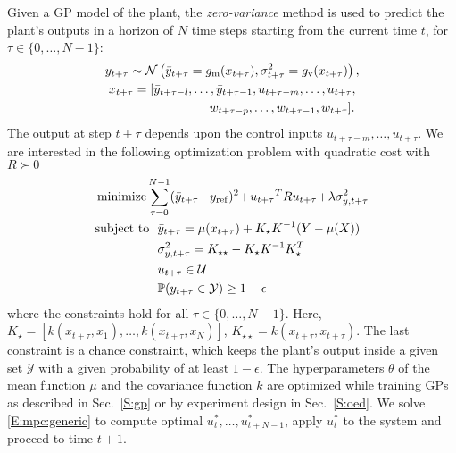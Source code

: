 Given a GP model of the plant, the \emph{zero-variance} method is used to predict the plant's outputs in a horizon of $N$ time steps starting from the current time $t$, for \(\tau \in \{0,\dots,N-1\}\):
\begin{gather}
y_{t+\tau} \sim \operatorname*{\mathcal{N}}\left(\bar{y}_{t+\tau} = g_{\mathrm m}(x_{t+\tau}), \sigma^2_{t+\tau} = g_{\mathrm v}(x_{t+\tau})\right), \\
x_{t + \tau} = [\bar y_{t+ \tau-l}, \dots, \bar y_{t+ \tau-1}, u_{t+ \tau-m}, \dots, u_{t+ \tau}, \nonumber \\
\qquad\qquad\qquad\qquad  w_{t+ \tau-p}, \dots, w_{t+ \tau-1}, w_{t+ \tau}]\text. \nonumber
\end{gather}
The output at step \(t+\tau\) depends upon %
the control inputs \(u_{t+\tau-m}, \dots, u_{t+\tau}\).
We are interested in the following optimization problem with quadratic cost with \(R \succ 0\)
\begin{align}
  &\minimize \sum_{\tau=0}^{N-1} (\bar{y}_{t+\tau}\!-\!y_{\mathrm{ref}})^2 \!+\! {u_{t+\tau}}^T R {u_{t+\tau}} \!+\! \lambda \sigma^2_{y,t+\tau} \label{E:mpc:generic} \\
  & 
    \begin{aligned}
      \st\ \  & \bar{y}_{t+\tau} = \mu(x_{t+\tau}) + K_\star K^{-1} (Y - \mu(X)) \nonumber\\
      & \sigma^2_{y,t+\tau} = K_{\star \star} - K_\star K^{-1} K_\star^T \\
      & u_{t+\tau} \in \mathcal{U} \nonumber \\
      & \mathbb{P}(y_{t+\tau} \in \mathcal{Y}) \geq 1 - \epsilon \nonumber
    \end{aligned}
\end{align}
where the constraints hold for all \(\tau \in \{0,\dots,N-1\}\).
Here, \(K_\star = [k(x_{t+\tau}, x_1), \dots, k(x_{t+\tau}, x_N)]\), \(K_{\star \star} = k(x_{t+\tau}, x_{t+\tau})\). %
The last constraint is a chance constraint, which keeps the plant's output inside a given set $\mathcal{Y}$ with a given probability of at least $1 - \epsilon$.
The hyperparameters \(\theta\) of the mean function \(\mu\) and the covariance function \(k\) are optimized while training GPs as described in Sec.~\ref{S:gp} or by experiment design in Sec.~\ref{S:oed}.
We solve \eqref{E:mpc:generic} to compute optimal \(u_{t}^*, \dots, u_{t+N-1}^*\), apply \(u_{t}^*\) to the system and proceed to time \(t+1\).

